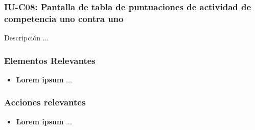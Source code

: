 
\subsubsection{IU-C08: Pantalla de tabla de puntuaciones de actividad de competencia uno contra uno}

 Descripción ...


\subsubsection{Elementos Relevantes}

    \begin{itemize}
    \item {\bf Lorem ipsum}
        ...
    \end{itemize}

\subsubsection{Acciones relevantes}

    \begin{itemize}
    \item {\bf Lorem ipsum}
        ...
    \end{itemize}

\clearpage
